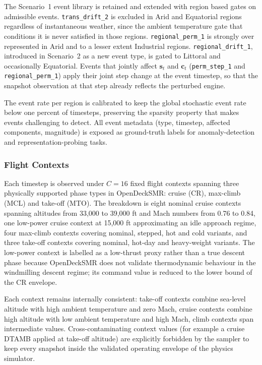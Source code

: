 The Scenario~1 event library is retained and extended with region
based gates on admissible events. \texttt{trans\_drift\_2} is excluded in Arid
and Equatorial regions regardless of instantaneous weather, since the
ambient temperature gate that conditions it is never satisfied in
those regions. \texttt{regional\_perm\_1} is strongly over represented
in Arid and to a lesser extent Industrial regions.
\texttt{regional\_drift\_1}, introduced in Scenario~2 as a new event
type, is gated to Littoral and occasionally Equatorial. Events that
jointly affect $\mathbf{s}_t$ and $\mathbf{c}_t$ (\texttt{perm\_step\_1}
and \texttt{regional\_perm\_1}) apply their joint step change at the
event timestep, so that the snapshot observation at that step already
reflects the perturbed engine.

The event rate per region is calibrated to keep the global stochastic
event rate below one percent of timesteps, preserving the sparsity
property that makes events challenging to detect. All event metadata
(type, timestep, affected components, magnitude) is exposed as
ground-truth labels for anomaly-detection and representation-probing
tasks.

\subsubsection{Flight Contexts}
\label{sec:scen4_contexts}

Each timestep is observed under $C = 16$ fixed flight contexts spanning
three physically supported phase types in OpenDeckSMR: cruise (CR),
max-climb (MCL) and take-off (MTO). The breakdown is eight nominal
cruise contexts spanning altitudes from 33{,}000 to 39{,}000 ft and
Mach numbers from 0.76 to 0.84, one low-power cruise context at
15{,}000 ft approximating an idle approach regime, four max-climb
contexts covering nominal, stepped, hot and cold variants, and three
take-off contexts covering nominal, hot-day and heavy-weight variants.
The low-power context is labelled as a low-thrust proxy rather than a
true descent phase because OpenDeckSMR does not validate thermodynamic
behaviour in the windmilling descent regime; its command value is
reduced to the lower bound of the CR envelope.

Each context remains internally consistent: take-off contexts combine
sea-level altitude with high ambient temperature and zero Mach, cruise
contexts combine high altitude with low ambient temperature and high
Mach, climb contexts span intermediate values. Cross-contaminating
context values (for example a cruise DTAMB applied at take-off altitude)
are explicitly forbidden by the sampler to keep every snapshot inside
the validated operating envelope of the physics simulator.

